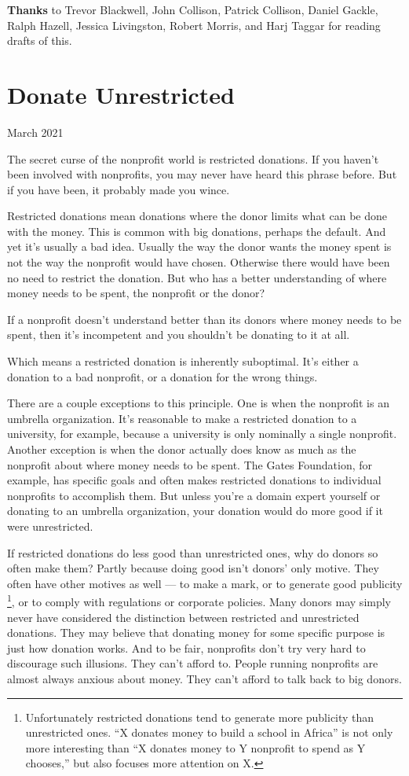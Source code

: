 \documentclass[12pt]{book}
\begin{document}
\textbf{Thanks} to Trevor Blackwell, John Collison, Patrick Collison,
Daniel Gackle, Ralph Hazell, Jessica Livingston, Robert Morris, and Harj
Taggar for reading drafts of this.
\chapter{Donate Unrestricted}

March 2021

The secret curse of the nonprofit world is restricted donations. If you
haven't been involved with nonprofits, you may never have heard this
phrase before. But if you have been, it probably made you wince.

Restricted donations mean donations where the donor limits what can be
done with the money. This is common with big donations, perhaps the
default. And yet it's usually a bad idea. Usually the way the donor
wants the money spent is not the way the nonprofit would have chosen.
Otherwise there would have been no need to restrict the donation. But
who has a better understanding of where money needs to be spent, the
nonprofit or the donor?

If a nonprofit doesn't understand better than its donors where money
needs to be spent, then it's incompetent and you shouldn't be donating
to it at all.

Which means a restricted donation is inherently suboptimal. It's either
a donation to a bad nonprofit, or a donation for the wrong things.

There are a couple exceptions to this principle. One is when the
nonprofit is an umbrella organization. It's reasonable to make a
restricted donation to a university, for example, because a university
is only nominally a single nonprofit. Another exception is when the
donor actually does know as much as the nonprofit about where money
needs to be spent. The Gates Foundation, for example, has specific goals
and often makes restricted donations to individual nonprofits to
accomplish them. But unless you're a domain expert yourself or donating
to an umbrella organization, your donation would do more good if it were
unrestricted.

If restricted donations do less good than unrestricted ones, why do
donors so often make them? Partly because doing good isn't donors' only
motive. They often have other motives as well --- to make a mark, or to
generate good publicity \footnote{Unfortunately restricted donations tend to generate more
publicity than unrestricted ones. ``X donates money to build a school in
Africa'' is not only more interesting than ``X donates money to Y
nonprofit to spend as Y chooses,'' but also focuses more attention on X.}, or to comply with
regulations or corporate policies. Many donors may simply never have
considered the distinction between restricted and unrestricted
donations. They may believe that donating money for some specific
purpose is just how donation works. And to be fair, nonprofits don't try
very hard to discourage such illusions. They can't afford to. People
running nonprofits are almost always anxious about money. They can't
afford to talk back to big donors.
\end{document}
